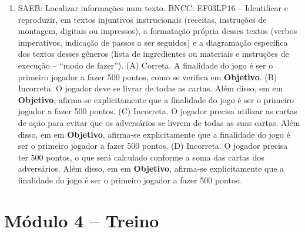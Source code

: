 \begin{enumerate}
\item
SAEB: Localizar informações num texto.
BNCC: EF03LP16 -- Identificar e reproduzir, em textos injuntivos
instrucionais (receitas, instruções de montagem, digitais ou impressos),
a formatação própria desses textos (verbos imperativos, indicação de
passos a ser seguidos) e a diagramação específica dos textos desses
gêneros (lista de ingredientes ou materiais e instruções de execução --
``modo de fazer'').
(A) Correta. A finalidade do jogo é ser o primeiro jogador a fazer 500
pontos, como se verifica em \textbf{Objetivo}.
(B) Incorreta. O jogador deve se livrar de todas as cartas. Além disso, em 
em \textbf{Objetivo}, afirma-se explicitamente que a finalidade do jogo
é ser o primeiro jogador a fazer 500 pontos.  
(C) Incorreta. O jogador precisa utilizar as cartas de ação para evitar
que os adversários se livrem de todas as suas cartas. Além disso, em 
em \textbf{Objetivo}, afirma-se explicitamente que a finalidade do jogo
é ser o primeiro jogador a fazer 500 pontos. 
(D) Incorreta. O jogador precisa ter 500 pontos, o que será calculado
conforme a soma das cartas dos adversários. Além disso, em 
em \textbf{Objetivo}, afirma-se explicitamente que a finalidade do jogo
é ser o primeiro jogador a fazer 500 pontos.
\end{enumerate}

\section*{Módulo 4 – Treino}

